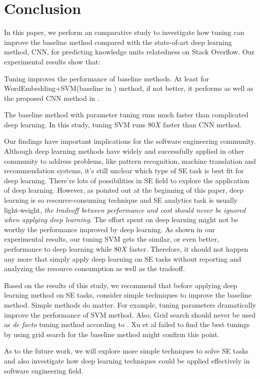 \section{Conclusion}

In this paper, we perform an comparative study to investigate
how tuning can improve the baseline method compared with
the state-of-art deep learning method, CNN, for predicting
knowledge units relatedness on Stack Overflow. Our experimental
results show that:

\bi
\item Tuning improves the performance of baseline methods. 
At least for WordEmbedding+SVM(baseline in \cite{xu2016predicting}) method, if not better,
it performs as well as the proposed CNN method in \cite{xu2016predicting}.
\item The baseline method with parameter tuning runs much faster than complicated deep learning.
In this study, tuning SVM runs $80X$ faster than CNN method.
\ei


Our findings have important implications for the software engineering community.
Although deep learning methods have widely and successfully applied in other community
to address problems, like pattern recognition, machine translation and recommendation
systems, it's still unclear which type of SE task is best fit for deep learning. There're lots
of possibilities in SE field to explore the application of deep learning. However, as pointed out
at the beginning of this paper, deep learning is so resource-consuming technique
and SE analytics task is usually light-weight,  {\it the  tradeoff between performance and cost should never
be ignored when applying deep learning}. The effort spent on deep learning might not be worthy the performance
improved by deep learning. As shown in our experimental results, our tuning SVM gets the similar,
 or even better, performance to deep learning while $80X$ faster.
Therefore, it should not happen any more that simply apply deep learning on SE tasks
without reporting and analyzing the resource consumption as well as the tradeoff.  

Based on the results of this study, we recommend that before applying 
deep learning method on SE tasks, consider simple techniques to improve the baseline method.
Simple methods do matter. For example, tuning parameters dramatically improve the 
performance of SVM method.  Also, Grid search should
never be used as {\it de facto} tuning method according to \cite{fu2016differential,bergstra2012random}. 
Xu et al failed to find the best tunings by using grid search for
the baseline method might confirm this point.

As to the future work, we will explore more simple techniques to solve SE tasks and also
investigate how deep learning techniques could be applied effectively in software engineering
field. 




